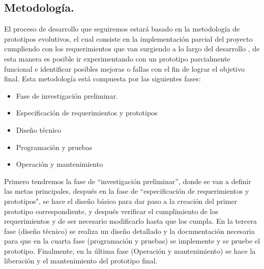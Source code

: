 \documentclass[12pt, a4paper, titlepage]{article}
\begin{document}
		\subsection{Metodolog\'ia.}
		El proceso de desarrollo que seguiremos estará basado en la metodología de prototipos evolutivos, el cual consiste en la implementación parcial del proyecto cumpliendo con los requerimientos que van surgiendo a lo largo del desarrollo , de esta manera es posible ir experimentando con un prototipo parcialmente funcional e identificar posibles mejoras o fallas con el fin de lograr el objetivo final.
		Esta metodología está compuesta por las siguientes fases:
		\begin{itemize}
		    \item Fase de investigación preliminar.
		    \item Especificación de requerimientos y prototipos
		    \item Diseño técnico
		    \item Programación y pruebas
		    \item Operación y mantenimiento
		\end{itemize}
		
        
        Primero tendremos la fase de “investigación preliminar”, donde se van a definir las metas principales, después en la fase de “especificación de requerimientos y prototipos", se hace el diseño básico para dar paso a la creación del primer prototipo correspondiente, y después verificar el cumplimiento de los requerimientos y de ser necesario modificarlo hasta que los cumpla. En la tercera fase (diseño técnico) se realiza un diseño detallado y la documentación necesaria para que en la cuarta fase (programación y pruebas) se implemente y se pruebe el prototipo. Finalmente, en la última fase (Operación y mantenimiento) se hace la liberación y el mantenimiento del prototipo final.
        
\end{document}
